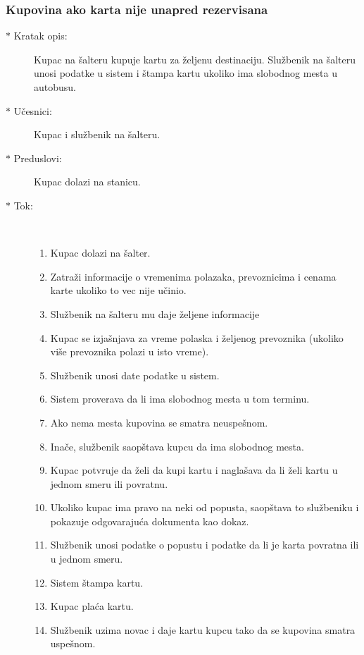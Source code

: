 \subsubsection{Kupovina ako karta nije unapred rezervisana}
\begin{description}
	\item[$\ast$ Kratak opis: ] Kupac na \v salteru kupuje kartu za \v zeljenu destinaciju. Slu\v zbenik na \v salteru unosi podatke u sistem i \v stampa kartu ukoliko ima slobodnog mesta u autobusu.
	\item[$\ast$ U\v cesnici: ] Kupac i slu\v zbenik na \v salteru.
	\item[$\ast$ Preduslovi: ] Kupac dolazi na stanicu.
	\item[$\ast$ Tok: ] \ \\
	\begin{enumerate}
		\item Kupac dolazi na \v salter.
		\item Zatra\v zi informacije o vremenima polazaka, prevoznicima i cenama karte ukoliko to vec nije u\v cinio.
		\item Slu\v zbenik na \v salteru mu daje \v zeljene informacije
		\item Kupac se izja\v snjava za vreme polaska i \v zeljenog prevoznika (ukoliko vi\v se prevoznika polazi u isto vreme).
		\item Slu\v zbenik unosi date podatke u sistem.
		\item Sistem proverava da li ima slobodnog mesta u tom terminu.
		\item Ako nema mesta kupovina se smatra neuspe\v snom.
		\item Ina\v ce, slu\v zbenik saop\v stava kupcu da ima slobodnog mesta.
		\item Kupac potvr\dj{}uje da \v zeli da kupi kartu i nagla\v sava da li \v zeli kartu u jednom smeru ili povratnu.
		\item Ukoliko kupac ima pravo na neki od popusta, saop\v stava to slu\v zbeniku i pokazuje odgovaraju\'ca dokumenta kao dokaz.
		\item Slu\v zbenik unosi podatke o popustu i podatke da li je karta povratna ili u jednom smeru.
		\item Sistem \v stampa kartu.
		\item Kupac pla\' ca kartu.
		\item Slu\v zbenik uzima novac i daje kartu kupcu tako da se kupovina smatra uspe\v snom.
	\end{enumerate}
\end{description}
